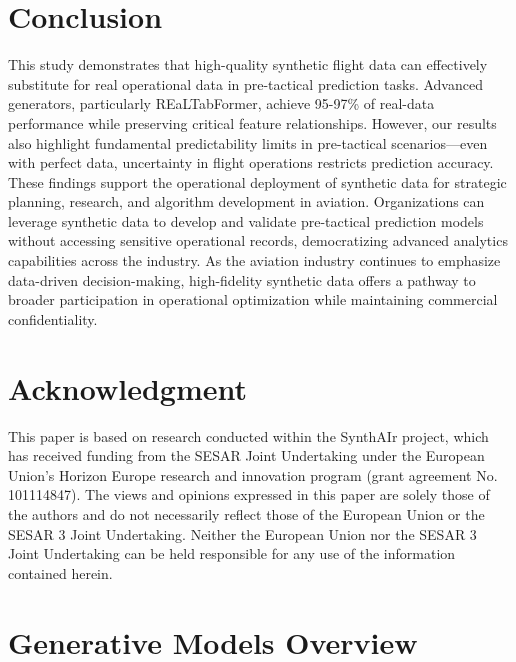 \documentclass[conference]{IEEEtran}
\begin{document}
\section{Conclusion}

This study demonstrates that high-quality synthetic flight data can effectively substitute for real operational data in pre-tactical prediction tasks. Advanced generators, particularly REaLTabFormer, achieve 95-97\% of real-data performance while preserving critical feature relationships. However, our results also highlight fundamental predictability limits in pre-tactical scenarios—even with perfect data, uncertainty in flight operations restricts prediction accuracy.
These findings support the operational deployment of synthetic data for strategic planning, research, and algorithm development in aviation. Organizations can leverage synthetic data to develop and validate pre-tactical prediction models without accessing sensitive operational records, democratizing advanced analytics capabilities across the industry. As the aviation industry continues to emphasize data-driven decision-making, high-fidelity synthetic data offers a pathway to broader participation in operational optimization while maintaining commercial confidentiality.


\section*{Acknowledgment}

This paper is based on research conducted within the SynthAIr project, which has received funding from the SESAR Joint Undertaking under the European Union’s Horizon Europe research and innovation program (grant agreement No. 101114847). The views and opinions expressed in this paper are solely those of the authors and do not necessarily reflect those of the European Union or the SESAR 3 Joint Undertaking. Neither the European Union nor the SESAR 3 Joint Undertaking can be held responsible for any use of the information contained herein.


\balance







\appendix
\label{sec:appendix}

\section{Generative Models Overview}
\label{sec:generative_models}
\end{document}
